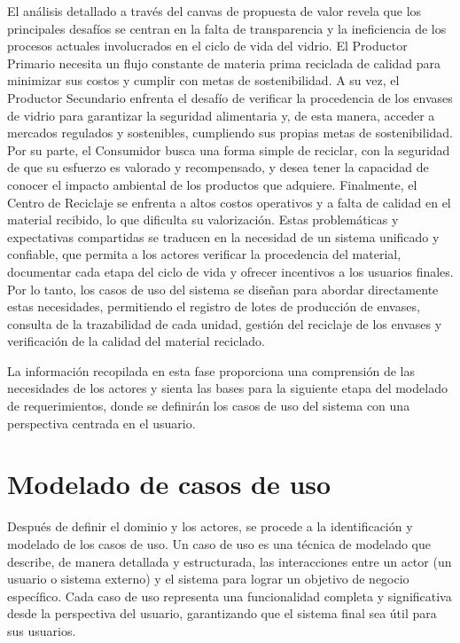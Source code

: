El análisis detallado a través del canvas de propuesta de valor revela que los principales desafíos se centran en la falta de transparencia y la ineficiencia de los procesos actuales involucrados en el ciclo de vida del vidrio. El Productor Primario necesita un flujo constante de materia prima reciclada de calidad para minimizar sus costos y cumplir con metas de sostenibilidad. A su vez, el Productor Secundario enfrenta el desafío de verificar la procedencia de los envases de vidrio para garantizar la seguridad alimentaria y, de esta manera, acceder a mercados regulados y sostenibles, cumpliendo sus propias metas de sostenibilidad. Por su parte, el Consumidor busca una forma simple de reciclar, con la seguridad de que su esfuerzo es valorado y recompensado, y desea tener la capacidad de conocer el impacto ambiental de los productos que adquiere. Finalmente, el Centro de Reciclaje se enfrenta a altos costos operativos y a falta de calidad en el material recibido, lo que dificulta su valorización. Estas problemáticas y expectativas compartidas se traducen en la necesidad de un sistema unificado y confiable, que permita a los actores verificar la procedencia del material, documentar cada etapa del ciclo de vida y ofrecer incentivos a los usuarios finales. Por lo tanto, los casos de uso del sistema se diseñan para abordar directamente estas necesidades, permitiendo el registro de lotes de producción de envases, consulta de la trazabilidad de cada unidad, gestión del reciclaje de los envases y verificación de la calidad del material reciclado.

La información recopilada en esta fase proporciona una comprensión de las necesidades de los actores y sienta las bases para la siguiente etapa del modelado de requerimientos, donde se definirán los casos de uso del sistema con una perspectiva centrada en el usuario.

\section{Modelado de casos de uso}
\label{sec:use-cases}

Después de definir el dominio y los actores, se procede a la identificación y modelado de los casos de uso. Un caso de uso es una técnica de modelado que describe, de manera detallada y estructurada, las interacciones entre un actor (un usuario o sistema externo) y el sistema para lograr un objetivo de negocio específico. Cada caso de uso representa una funcionalidad completa y significativa desde la perspectiva del usuario, garantizando que el sistema final sea útil para sus usuarios.

